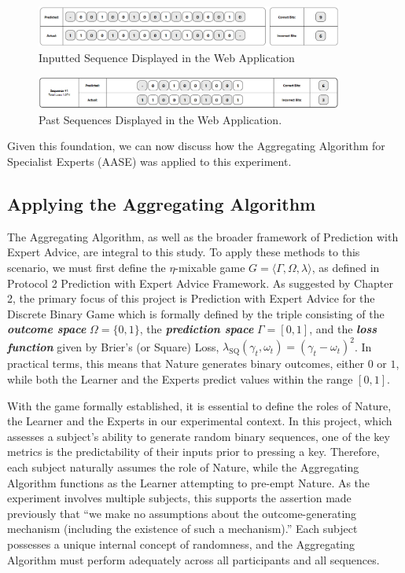 \begin{figure}[ht]
    \centering
    \includegraphics[width=0.9\textwidth]{images/sequence_input.png}
    \caption{Inputted Sequence Displayed in the Web Application}
\end{figure}

\begin{figure}[ht]
    \centering
    \includegraphics[width=0.9\textwidth]{images/past_sequences.png}
    \caption{Past Sequences Displayed in the Web Application.}
\end{figure}

Given this foundation, we can now discuss how the Aggregating Algorithm for Specialist Experts (AASE) was applied to this experiment.

\subsection{Applying the Aggregating Algorithm}
The Aggregating Algorithm, as well as the broader framework of Prediction with Expert Advice, are integral to this study. To apply these methods to this scenario, we must first define the $\eta$-mixable game $G = \langle \Gamma, \Omega, \lambda \rangle$, as defined in Protocol 2 \textendash{} Prediction with Expert Advice Framework. As suggested by Chapter 2, the primary focus of this project is Prediction with Expert Advice for the Discrete Binary Game which is formally defined by the triple consisting of the \textbf{\textit{outcome space}} $\Omega = \{0, 1\}$, the \textbf{\textit{prediction space}} $\Gamma = [0, 1]$, and the \textbf{\textit{loss function}} given by Brier's (or Square) Loss, $\lambda_\text{SQ}(\gamma_t, \omega_t) = {(\gamma_t - \omega_t)}^2$. In practical terms, this means that Nature generates binary outcomes, either $0$ or $1$, while both the Learner and the Experts predict values within the range $[0, 1]$.

With the game formally established, it is essential to define the roles of Nature, the Learner and the Experts in our experimental context. In this project, which assesses a subject's ability to generate random binary sequences, one of the key metrics is the predictability of their inputs prior to pressing a key. Therefore, each subject naturally assumes the role of Nature, while the Aggregating Algorithm functions as the Learner attempting to pre-empt Nature. As the experiment involves multiple subjects, this supports the assertion made previously that ``we make no assumptions about the outcome-generating mechanism (including the existence of such a mechanism).'' Each subject possesses a unique internal concept of randomness, and the Aggregating Algorithm must perform adequately across all participants and all sequences.

